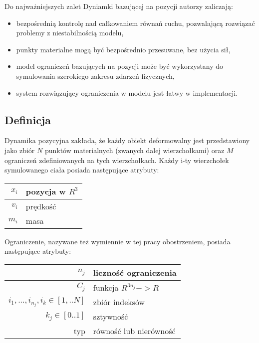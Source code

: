 Do najważniejszych zalet Dyniamki bazującej na pozycji autorzy \cite{pbdyn}
zaliczają:
\begin{itemize}
	\item bezpośrednią kontrolę nad całkowaniem równań ruchu, pozwalającą
	rozwiązać problemy z niestabilnością modelu,
	\item punkty materialne mogą być bezpośrednio przesuwane, bez użycia sił,
	\item model ograniczeń bazujących na pozycji może być wykorzystany do
	symulowania szerokiego zakresu zdarzeń fizycznych,
	\item system rozwiązujący ograniczenia w modelu jest łatwy w implementacji.
\end{itemize}

\subsection{Definicja}
Dynamika pozycyjna zakłada, że każdy obiekt deformowalny jest przedstawiony jako zbiór $N$
punktów materialnych (zwanych dalej wierzchołkami) oraz $M$ ograniczeń
zdefiniowanych na tych wierzchołkach. Każdy i-ty wierzchołek symulowanego ciała posiada
następujące atrybuty:

\vspace{0.5cm}
\centering
\begin{tabular}{|r|l|}
\hline
$x_i$ & pozycja w $R^3$ \\
\hline
$v_i$ & prędkość \\
\hline
$m_i$ & masa\\
\hline
\end{tabular}
\vspace{0.5cm}

\raggedright
Ograniczenie, nazywane też wymiennie w tej pracy obostrzeniem,
posiada następujące atrybuty:
\vspace{0.5cm}

\centering
\begin{tabular}{|r|l|}
\hline
$n_j$ & liczność ograniczenia \\
\hline
$C_j$ & funkcja $R^{3n_j} -> R$\\
\hline
${i_1, ..., i_{n_j}}, i_k \in [1,..N]$ & zbiór indeksów\\
\hline
$k_j \in [0.. 1]$ & sztywność\\
\hline
typ & równość lub nierówność\\
\hline
\end{tabular}
\vspace{0.5cm}

